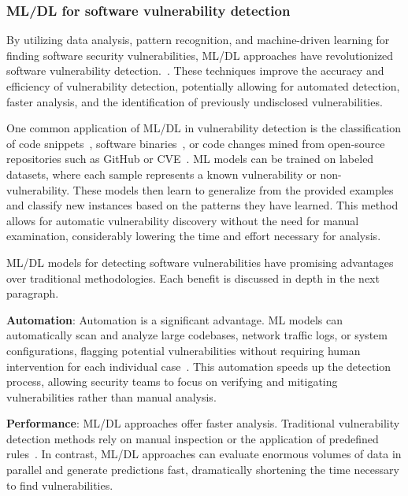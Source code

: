 \subsubsection{ML/DL for software vulnerability detection}

By utilizing data analysis, pattern recognition, and machine-driven learning for finding software security vulnerabilities, ML/DL approaches have revolutionized software vulnerability detection.~\cite{wang2018deep,cheng2021deepwukong,li2021vulnerability,le2021deepcva,yan2021han}. These techniques improve the accuracy and efficiency of vulnerability detection, potentially allowing for automated detection, faster analysis, and the identification of previously undisclosed vulnerabilities.

One common application of ML/DL in vulnerability detection is the classification of code snippets~\cite{dam2017automatic, shippey2019automatically, wang2016automatically, jeon2021autovas}, software binaries~\cite{phan2017convolutional,
nguyen2020deep,
yan2021han,
huang2021hunting}, or code changes mined from open-source repositories such as GitHub or CVE~\cite{sabetta2018practical,
wang2020combining,
liu2019deepbalance,
pradel2018deepbugs,
hoang2019deepjit,
zhou2019devign,
dinella2020hoppity,
3360588}. ML models can be trained on labeled datasets, where each sample represents a known vulnerability or non-vulnerability. These models then learn to generalize from the provided examples and classify new instances based on the patterns they have learned. This method allows for automatic vulnerability discovery without the need for manual examination, considerably lowering the time and effort necessary for analysis. 

ML/DL models for detecting software vulnerabilities have promising advantages over traditional methodologies. Each benefit is discussed in depth in the next paragraph. 

\noindent \textbf{Automation}: Automation is a significant advantage. ML models can automatically scan and analyze large codebases, network traffic logs, or system configurations, flagging potential vulnerabilities without requiring human intervention for each individual case~\cite{chakraborty2021deep}. This automation speeds up the detection process, allowing security teams to focus on verifying and mitigating vulnerabilities rather than manual analysis.

\noindent \textbf{Performance}: ML/DL approaches offer faster analysis. Traditional vulnerability detection methods rely on manual inspection or the application of predefined rules~\cite{staron2020using, bacchelli2013expectations, carlsson2005software, shar2012auditing, shar2010auditing}. In contrast, ML/DL approaches can evaluate enormous volumes of data in parallel and generate predictions fast, dramatically shortening the time necessary to find vulnerabilities.

